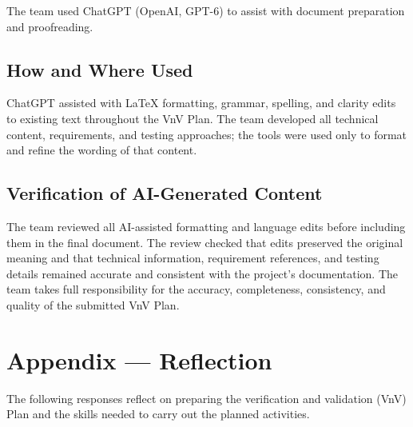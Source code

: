 \documentclass[12pt, titlepage]{article}
\newcounter{validation}
\begin{document}
The team used ChatGPT (OpenAI, GPT-6) to assist with document preparation and
proofreading.

\subsection{How and Where Used}

ChatGPT assisted with \LaTeX{} formatting, grammar, spelling, and
clarity edits to existing text throughout the VnV Plan. The team developed all
technical content, requirements, and testing approaches; the tools were used
only to format and refine the wording of that content.

\subsection{Verification of AI-Generated Content}

The team reviewed all AI-assisted formatting and language edits before including
them in the final document. The review checked that edits preserved the original
meaning and that technical information, requirement references, and testing
details remained accurate and consistent with the project's documentation. The
team takes full responsibility for the accuracy, completeness, consistency, and
quality of the submitted VnV Plan.

\newpage{}

\section{Appendix --- Reflection}

The following responses reflect on preparing the verification and validation
(VnV) Plan and the skills needed to carry out the planned activities.
\end{document}

